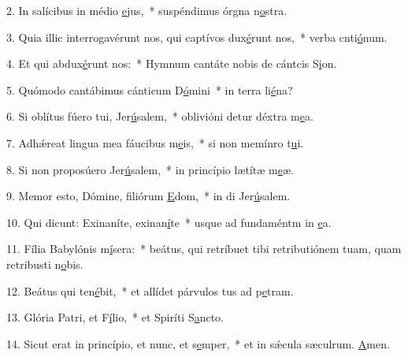 2. In salícibus in médio \uline{e}jus,~* suspéndimus órgna n\uline{o}stra.\par 
3. Quia illic interrogavérunt nos, qui captívos dux\uline{é}runt nos,~* verba cnti\uline{ó}num.\par 
4. Et qui abdux\uline{é}runt nos:~* Hymnum cantáte nobis de cántcis S\uline{i}on.\par 
5. Quómodo cantábimus cánticum D\uline{ó}mini~* in terra li\uline{é}na?\par 
6. Si oblítus fúero tui, Jer\uline{ú}salem,~* oblivióni detur déxtra m\uline{e}a.\par 
7. Adhǽreat lingua mea fáucibus m\uline{e}is,~* si non memínro t\uline{u}i.\par 
8. Si non proposúero Jer\uline{ú}salem,~* in princípio lætítæ m\uline{e}æ.\par 
9. Memor esto, Dómine, filiórum \uline{E}dom,~* in di Jer\uline{ú}salem.\par 
10. Qui dicunt: Exinaníte, exinan\uline{í}te~* usque ad fundaméntm in \uline{e}a.\par 
11. Fília Babylónis m\uline{í}sera:~* beátus, qui retríbuet tibi retributiónem tuam, quam retribusti n\uline{o}bis.\par 
12. Beátus qui ten\uline{é}bit,~* et allídet párvulos tus ad p\uline{e}tram.\par 
13. Glória Patri, et F\uline{í}lio,~* et Spiríti S\uline{a}ncto.\par 
14. Sicut erat in princípio, et nunc, et s\uline{e}mper,~* et in sǽcula sæculrum. \uline{A}men.\par 
